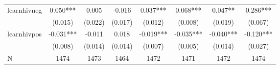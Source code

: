 \begin{tabular}{lccccccc}
\hline
learnhivneg & 0.050*** & 0.005 & -0.016 & 0.037*** & 0.068*** & 0.047** & 0.286*** \\
 & (0.015) & (0.022) & (0.017) & (0.012) & (0.008) & (0.019) & (0.067) \\
learnhivpos & -0.031*** & -0.011 & 0.018 & -0.019*** & -0.035*** & -0.040*** & -0.120*** \\
 & (0.008) & (0.014) & (0.014) & (0.007) & (0.005) & (0.014) & (0.027) \\
\hline
N & 1474 & 1473 & 1464 & 1472 & 1471 & 1472 & 1474 \\
\hline
\end{tabular}
